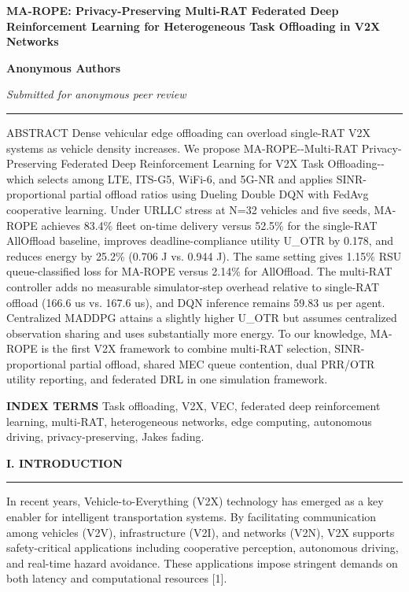 \documentclass[journal,10pt,twocolumn]{IEEEtran}
\begin{document}
\textbf{MA-ROPE: Privacy-Preserving Multi-RAT Federated Deep
Reinforcement Learning for Heterogeneous Task Offloading in V2X
Networks}

\textbf{Anonymous Authors}

\emph{Submitted for anonymous peer review}

\begin{center}\rule{0.5\linewidth}{0.5pt}\end{center}

ABSTRACT Dense vehicular edge offloading can overload single-RAT V2X
systems as vehicle density increases. We propose MA-ROPE-\/-Multi-RAT
Privacy-Preserving Federated Deep Reinforcement Learning for V2X Task
Offloading-\/-which selects among LTE, ITS-G5, WiFi-6, and 5G-NR and
applies SINR-proportional partial offload ratios using Dueling Double
DQN with FedAvg cooperative learning. Under URLLC stress at N=32
vehicles and five seeds, MA-ROPE achieves 83.4\% fleet on-time delivery
versus 52.5\% for the single-RAT AllOffload baseline, improves
deadline-compliance utility U\_OTR by 0.178, and reduces energy by
25.2\% (0.706 J vs. 0.944 J). The same setting gives 1.15\% RSU
queue-classified loss for MA-ROPE versus 2.14\% for AllOffload. The
multi-RAT controller adds no measurable simulator-step overhead relative
to single-RAT offload (166.6 us vs. 167.6 us), and DQN inference remains
59.83 us per agent. Centralized MADDPG attains a slightly higher U\_OTR
but assumes centralized observation sharing and uses substantially more
energy. To our knowledge, MA-ROPE is the first V2X framework to combine
multi-RAT selection, SINR-proportional partial offload, shared MEC queue
contention, dual PRR/OTR utility reporting, and federated DRL in one
simulation framework.

\textbf{INDEX TERMS} Task offloading, V2X, VEC, federated deep
reinforcement learning, multi-RAT, heterogeneous networks, edge
computing, autonomous driving, privacy-preserving, Jakes fading.

\textbf{I. INTRODUCTION}

\begin{center}\rule{0.5\linewidth}{0.5pt}\end{center}

In recent years, Vehicle-to-Everything (V2X) technology has emerged as a
key enabler for intelligent transportation systems. By facilitating
communication among vehicles (V2V), infrastructure (V2I), and networks
(V2N), V2X supports safety-critical applications including cooperative
perception, autonomous driving, and real-time hazard avoidance. These
applications impose stringent demands on both latency and computational
resources {[}1{]}.
\end{document}
